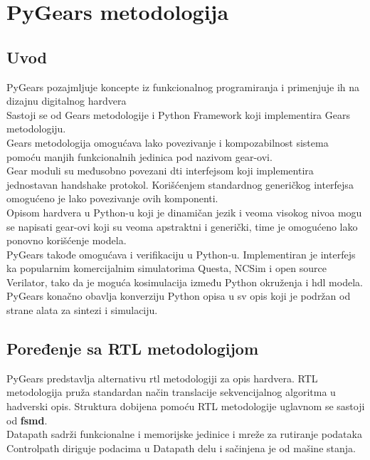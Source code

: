 \section{PyGears metodologija} \label{pygears_sec}

\subsection{Uvod}

PyGears\cite{pygears_site} pozajmljuje koncepte iz funkcionalnog programiranja i primenjuje ih na
dizajnu digitalnog hardvera \\
Sastoji se od Gears metodologije i Python Framework koji implementira Gears metodologiju. \\
Gears metodologija omogućava lako povezivanje i kompozabilnost sistema pomoću manjih
funkcionalnih jedinica pod nazivom gear-ovi. \\
Gear moduli su međusobno povezani \gls{dti} interfejsom koji implementira jednostavan
handshake protokol.
Korišćenjem standardnog generičkog interfejsa omogućeno je lako povezivanje ovih
komponenti. \\

Opisom hardvera u Python-u koji je dinamičan jezik i veoma visokog nivoa mogu se
napisati gear-ovi koji su veoma apstraktni i generički, time je omogućeno lako
ponovno korišćenje modela. \\

PyGears takođe omogućava i verifikaciju u Python-u. Implementiran je interfejs
ka popularnim komercijalnim simulatorima Questa, NCSim i open source Verilator,
tako da je moguća kosimulacija između Python okruženja i \gls{hdl} modela. \\

PyGears konačno obavlja konverziju Python opisa u \gls{sv} opis koji
je podržan od strane alata za sintezi i simulaciju.

\subsection{Poređenje sa RTL metodologijom}

PyGears\cite{PyGears_OSDA} predstavlja alternativu \gls{rtl}\cite{chu2006rtl} metodologiji za opis hardvera.
RTL metodologija pruža standardan način translacije sekvencijalnog algoritma u
hadverski opis.
Struktura dobijena pomoću RTL metodologije uglavnom se sastoji od \textbf{\gls{fsmd}}. \\
Datapath sadrži funkcionalne i memorijske jedinice i mreže za rutiranje podataka\cite{PSDS_5} \\
Controlpath diriguje podacima u Datapath delu i sačinjena je od mašine stanja.\\

